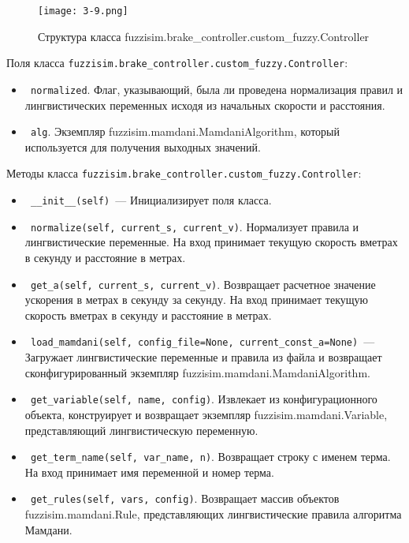 \begin{figure}[ht]
	\centering
	\texttt{[image: 3-9.png]}
	\caption{ Структура класса fuzzisim.brake\_controller.custom\_fuzzy.Controller}
\end{figure}

Поля класса \lstinline!fuzzisim.brake_controller.custom_fuzzy.Controller!:
\begin{itemize}
	\item \lstinline! normalized!. Флаг, указывающий, была ли проведена нормализация правил и  лингвистических переменных исходя из начальных скорости и расстояния.
	\item \lstinline! alg!. Экземпляр fuzzisim.mamdani.MamdaniAlgorithm, который используется для получения выходных значений.
\end{itemize}


Методы класса \lstinline!fuzzisim.brake_controller.custom_fuzzy.Controller!:
\begin{itemize}
	\item \lstinline! __init__(self) !— Инициализирует поля класса.
	\item \lstinline! normalize(self, current_s, current_v)!. Нормализует правила и лингвистические переменные. На вход принимает текущую скорость вметрах в секунду и расстояние в метрах.
	\item \lstinline! get_a(self, current_s, current_v)!. Возвращает расчетное значение ускорения в метрах в секунду за секунду. На вход принимает текущую скорость вметрах в секунду и расстояние в метрах.
	\item \lstinline! load_mamdani(self, config_file=None, current_const_a=None) !— Загружает лингвистические переменные и правила из файла и возвращает сконфигурированный экземпляр fuzzisim.mamdani.MamdaniAlgorithm.
	\item \lstinline! get_variable(self, name, config)!. Извлекает из конфигурационного объекта, конструирует  и возвращает экземпляр fuzzisim.mamdani.Variable, представляющий лингвистическую переменную.
	\item \lstinline! get_term_name(self, var_name, n)!.  Возвращает строку с именем терма. На вход принимает имя переменной и номер терма.
	\item \lstinline! get_rules(self, vars, config)!. Возвращает массив объектов fuzzisim.mamdani.Rule, представляющих лингвистические правила алгоритма Мамдани.
\end{itemize}



